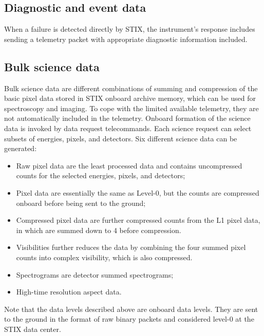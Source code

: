\documentclass[referee]{aa} %
\begin{document}
\subsection{Diagnostic and event data}
When a failure is detected directly by STIX, the instrument’s response includes sending a telemetry packet with appropriate diagnostic information included.

\subsection{Bulk science data}

Bulk science data are different combinations of summing and compression of the basic pixel data stored in STIX onboard archive memory, which can be used for spectroscopy and imaging.
To cope with the limited available telemetry, they are not automatically included in the telemetry.
Onboard formation of the science data is invoked by data request telecommands.
Each science request can select subsets of energies, pixels, and detectors.
Six different science data can be generated:
\begin{itemize}
 \item Raw pixel data are the least processed data and contains uncompressed counts for the selected energies, pixels, and detectors;
\item Pixel data are essentially the same as Level-0, but the counts are compressed onboard before being sent to the ground;
\item Compressed pixel data are further compressed counts from the L1 pixel data, in which are summed down to 4 before compression.
\item Visibilities further reduces the data by combining the four summed pixel counts into complex visibility, which is also compressed.
\item Spectrograms are detector summed spectrograms;
\item High-time resolution aspect data.
\end{itemize}
Note that the data levels described 
above are onboard data levels. They are sent to the ground in the format of raw binary packets and 
considered level-0 at the STIX data center.  
\begin{table}[h]
\centering
\caption{STIX raw telemetry data coverage, data rate, and typical reception delay at SDC.  }
\label{tb:raw_types}
\end{table}
\end{document}
